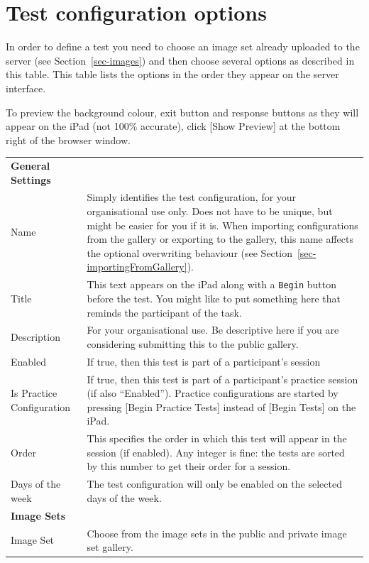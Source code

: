 \documentclass{article}
\begin{document}
\section{Test configuration options}
\label{sec-tests}

In order to define a test you need to choose an image set already
uploaded to the server (see Section~\ref{sec-images}) and then choose
several options as described in this table. This table lists the
options in the order they appear on the server interface.

To preview the background colour, exit button and response buttons as they will appear on the iPad (not 100\% accurate), click [Show Preview] at the bottom right of the browser window.

\begin{longtable}{|p{5cm}|p{10cm}|}
\hline
{\bf General Settings}  & \\\nopagebreak
\hline
Name & Simply identifies the test configuration, for your organisational use only. Does not have to be unique, but might be easier for you if it is. When importing configurations from the gallery or exporting to the gallery, this name affects the optional overwriting behaviour (see Section~\ref{sec-importingFromGallery}). \\
\hline
Title & This text appears on the iPad along with a {\tt Begin} button
before the test.
You might like to put something here that reminds the participant of
the task.
\\
\hline
Description & For your organisational use. Be descriptive here if you are considering submitting this to the public gallery.\\
\hline
Enabled & If true, then this test is part of a participant's session\\
\hline
Is Practice Configuration & If true, then this test is part of a participant's practice session (if also ``Enabled''). Practice configurations are started by pressing [Begin Practice Tests] instead of [Begin Tests] on the iPad.\\
\hline
Order & This specifies the order in which this test will appear in 
the session (if enabled). Any integer is fine: the tests are sorted by this number to get their order for a session.\\
\hline
Days of the week & The test configuration will only be enabled 
on the selected days of the week.\\
\hline
\hline
{\bf Image Sets}  & \\\nopagebreak
Image Set & Choose from the image sets in the public and private image set gallery.\\

\end{longtable}
\end{document}
